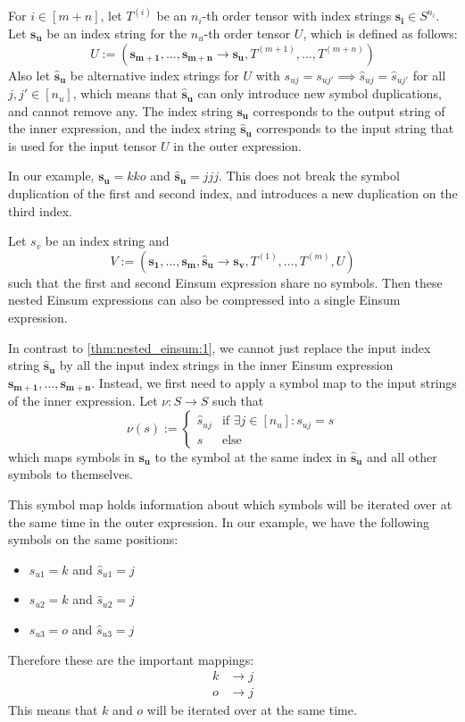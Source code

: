 \begin{theorem}
    \label{thm:nested_einsum:2}

    For $i \in [m + n]$, let $T^{(i)}$ be an $n_i$-th order tensor with index strings $\bm{s_i} \in S^{n_i}$.
    Let $\bm{s_u}$ be an index string for the $n_u$-th order tensor $U$, which is defined as follows:
    $$U := (\bm{s_{m + 1}},\dots,\bm{s_{m + n}} \rightarrow \bm{s_u}, T^{(m + 1)},\dots,T^{(m + n)})$$
    Also let $\bm{\hat{s}_u}$ be alternative index strings for $U$ with $s_{uj} = s_{uj'} \implies \hat{s}_{uj} = \hat{s}_{uj'}$ for all $j, j' \in [n_u]$,
    which means that $\bm{\hat{s}_u}$ can only introduce new symbol duplications, and cannot remove any.
    The index string $\bm{s_u}$ corresponds to the output string of the inner expression,
    and the index string $\bm{\hat{s}_u}$ corresponds to the input string that is used for the input tensor $U$ in the outer expression.

    In our example, $\bm{s_u} = kko$ and $\bm{\hat{s}_u} = jjj$.
    This does not break the symbol duplication of the first and second index,
    and introduces a new duplication on the third index.

    Let $s_v$ be an index string and
    $$V := (\bm{s_1},\dots,\bm{s_m}, \bm{\hat{s}_u} \rightarrow \bm{s_v}, T^{(1)},\dots,T^{(m)}, U)$$
    such that the first and second Einsum expression share no symbols.
    Then these nested Einsum expressions can also be compressed into a single Einsum expression.

    In contrast to \autoref{thm:nested_einsum:1}, we cannot just replace the input index string $\bm{\hat{s}_u}$ by all the input index strings in the inner Einsum expression $\bm{s_{m + 1}},\dots,\bm{s_{m + n}}$.
    Instead, we first need to apply a symbol map to the input strings of the inner expression.
    Let $\nu: S \rightarrow S$ such that
    $$\nu(s) := \begin{cases}
            \hat{s}_{uj} & \text{if }\exists j \in [n_u]: s_{uj} = s \\
            s            & \text{else}
        \end{cases}$$
    which maps symbols in $\bm{s_u}$ to the symbol at the same index in $\bm{\hat{s}_u}$ and all other symbols to themselves.

    This symbol map holds information about which symbols will be iterated over at the same time in the outer expression.
    In our example, we have the following symbols on the same positions:
    \begin{itemize}
        \item $s_{u1} = k$ and $\hat{s}_{u1} = j$
        \item $s_{u2} = k$ and $\hat{s}_{u2} = j$
        \item $s_{u3} = o$ and $\hat{s}_{u3} = j$
    \end{itemize}
    Therefore these are the important mappings:
    \begin{align*}
        k & \rightarrow j \\
        o & \rightarrow j
    \end{align*}
    This means that $k$ and $o$ will be iterated over at the same time.


\end{theorem}
